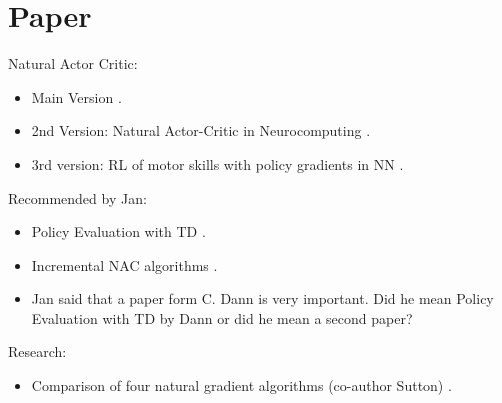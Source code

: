

\date{Received: date / Accepted: date}


\maketitle

\newpage

\section{Paper}
Natural Actor Critic:
\begin{itemize}
	\item Main Version \cite{peters2005natural}.
	\item 2nd Version: Natural Actor-Critic in Neurocomputing \cite{peters2008natural}.
	\item 3rd version: RL of motor skills with policy gradients in NN \cite{peters2008reinforcement}.
\end{itemize}

\noindent Recommended by Jan:
\begin{itemize}
	\item Policy Evaluation with TD \cite{dann2014policy}.
	\item Incremental NAC algorithms \cite{bhatnagar2008incremental}.
	\item Jan said that a paper form C. Dann is very important. Did he mean Policy Evaluation with TD by Dann or did he mean a second paper?
\end{itemize}

\noindent Research:
\begin{itemize}
	\item Comparison of four natural gradient algorithms (co-author Sutton) \cite{bhatnagar2009natural}.
\end{itemize}

